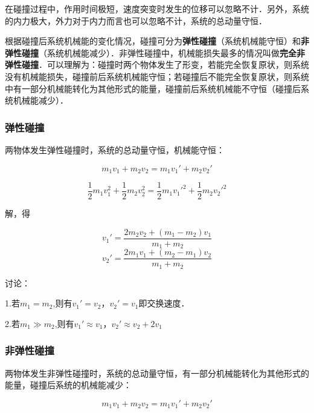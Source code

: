 在碰撞过程中，作用时间极短，速度突变时发生的位移可以忽略不计．另外，系统的内力极大，外力对于内力而言也可以忽略不计，系统的总动量守恒．

根据碰撞后系统机械能的变化情况，碰撞可分为\textbf{弹性碰撞}（系统机械能守恒）和\textbf{非弹性碰撞}（系统机械能减少）．非弹性碰撞中，机械能损失最多的情况叫做\textbf{完全非弹性碰撞}．可以理解为：碰撞时两个物体发生了形变，若能完全恢复原状，则系统没有机械能损失，碰撞前后系统机械能守恒；若碰撞后不能完全恢复原状，则系统中有一部分机械能转化为其他形式的能量，碰撞前后系统机械能不守恒（碰撞后系统机械能减少）．

\subsubsection{弹性碰撞}

两物体发生弹性碰撞时，系统的总动量守恒，机械能守恒：

\begin{equation}
m_1v_1+m_2v_2=m_1v_1'+m_2v_2'
\end{equation}

\begin{equation}
\frac12m_1v_1^2+\frac12m_2v_2^2=\frac12m_1v_1'^2+\frac12m_2v_2'^2
\end{equation}

解，得

\begin{equation}
v_1'= \frac{2m_2v_2 + (m_1 - m_2)v_1}{m_1+m_2}
\end{equation}
\begin{equation}
v_2'= \frac{2m_1v_1 + (m_2 - m_1)v_2}{m_1+m_2}
\end{equation}

讨论：

1.若$m_1=m_2$,则有$v_1'=v_2$，$v_2'=v_1$即交换速度．

2.若$m_1\gg m_2$,则有$v_1'\approx v_1$，$v_2'\approx v_2+2v_1$

\subsubsection{非弹性碰撞}

两物体发生非弹性碰撞时，系统的总动量守恒，有一部分机械能转化为其他形式的能量，碰撞后系统的机械能减少：

\begin{equation}
m_1v_1+m_2v_2=m_1v_1'+m_2v_2'
\end{equation}

